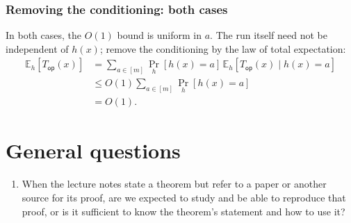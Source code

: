 \documentclass[12pt,a4paper]{article}
\begin{document}
\subsubsection*{Removing the conditioning: both cases}
In both cases, the $O(1)$ bound is uniform in $a$.
The run itself need not be independent of $h(x)$; remove the conditioning
by the law of total expectation:
\[
\begin{aligned}
\mathbb E_h[T_{\mathsf{op}}(x)]
&=\sum_{a\in[m]}\Pr_h[h(x)=a]\,
 \mathbb E_h[T_{\mathsf{op}}(x)\mid h(x)=a]\\
&\leq O(1)\sum_{a\in[m]}\Pr_h[h(x)=a]\\
&=O(1).
\end{aligned}
\]

\clearpage
\section*{General questions}
\begin{enumerate}
\item When the lecture notes state a theorem but refer to a paper or another
source for its proof, are we expected to study and be able to reproduce that
proof, or is it sufficient to know the theorem's statement and how to use it?
\end{enumerate}
\end{document}
